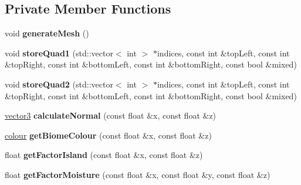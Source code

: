 \subsection*{Private Member Functions}
\begin{DoxyCompactItemize}
\item 
\mbox{\label{classflounder_1_1terrain_a1b4fc7d22eb42dac72b292e2b40152c4}} 
void {\bfseries generate\+Mesh} ()
\item 
\mbox{\label{classflounder_1_1terrain_a8571a678a658b748653cc20100fc9ed6}} 
void {\bfseries store\+Quad1} (std\+::vector$<$ int $>$ $\ast$indices, const int \&top\+Left, const int \&top\+Right, const int \&bottom\+Left, const int \&bottom\+Right, const bool \&mixed)
\item 
\mbox{\label{classflounder_1_1terrain_af2cd9daf244f5308747bc51404e3b73a}} 
void {\bfseries store\+Quad2} (std\+::vector$<$ int $>$ $\ast$indices, const int \&top\+Left, const int \&top\+Right, const int \&bottom\+Left, const int \&bottom\+Right, const bool \&mixed)
\item 
\mbox{\label{classflounder_1_1terrain_a981d60b668a36b2d1d254a4a302a1ff2}} 
\hyperlink{classflounder_1_1vector3}{vector3} {\bfseries calculate\+Normal} (const float \&x, const float \&z)
\item 
\mbox{\label{classflounder_1_1terrain_a9e66554fa6888b598eb65ef494b6e7f9}} 
\hyperlink{classflounder_1_1colour}{colour} {\bfseries get\+Biome\+Colour} (const float \&x, const float \&z)
\item 
\mbox{\label{classflounder_1_1terrain_a4b2047a3f720a13effeb6a418f7e41d9}} 
float {\bfseries get\+Factor\+Island} (const float \&x, const float \&z)
\item 
\mbox{\label{classflounder_1_1terrain_a078424214f40db2d57078f4463a985cd}} 
float {\bfseries get\+Factor\+Moisture} (const float \&x, const float \&y, const float \&z)
\end{DoxyCompactItemize}
